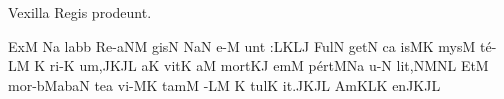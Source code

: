 \beginhymn Vexilla Regis prodeunt.

\Internote
\nosolesmescustos
\initiumgregorianum
{}%
\sgn {}Ex\punctum M\egn
{}\pes Na\egn
\sgn la{}\bmolle b\punctum b\egn
\spatium
\sgn R{e}-\climacus aNM\egn
\sgn gis\punctum N\egn
\spatium
{}\torculus NaN\egn
\sgn {}e-\punctum M\egn
\sgn {}u{nt :}\clivis LK\augmentumduplex LJ\egn
\spatium
\divisiominor
\spatium
\sgn F{u}l\punctum N\egn
\sgn get\punctum N\egn
\spatium
{}c\punctum a\egn
\sgn {}is\clivis MK\egn
\spatium
\sgn mys\punctum M\egn
\sgn t{\'e}-\pes LM\egn
\spatium
\custos K
\lineaproxima
\sgn ri-\punctum K\egn
\sgn {}u{m,}\pes JK\augmentumduplex JL\egn
\spatium
\divisiomaior
\spatium
{}a{}\punctum K\egn
\spatium
\sgn v{i}t\punctum K\egn
\sgn {}a{}\punctum M\egn
\spatium
\sgn mo{rt}\clivis KJ\egn
\sgn {}em\punctum M\egn
\spatium
\sgn p{\'e}{rt}\Salicus MNa\egn
\sgn {}u-\punctum N\egn
\sgn li{t,}\clivis NM\augmentumduplex NL\egn
\spatium
\divisiominor
\spatium
\sgn {}Et\punctum M\egn
\spatium
\sgn m{o}{r-}\bmolle b\scandicussubbipunctis MabaN\egn
\sgn te{}\punctum a\egn
\spatium
\sgn v{i}-\clivis MK\egn
\sgn tam\punctum M\egn
\spatium
{}-\pes LM\egn
\spatium
\custos K
\lineaproxima
\sgn tul\punctum K\egn
\sgn {}i{t.}\pes JK\augmentumduplex JL\egn
\spatium
\divisiofinalis
\spatium
\sgn {}Am\torculus KLK\egn
\sgn {}en\pes JK\augmentumduplex JL\egn
\Finisgregoriana

\bigskip

\beginlyrics


